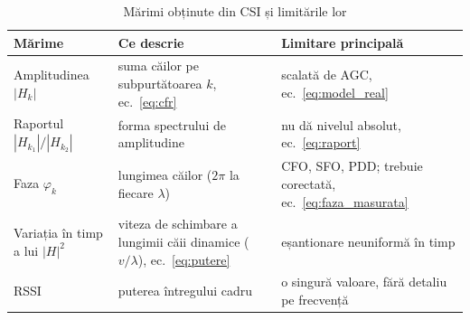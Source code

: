 \begin{table}[ht]
	\caption{Mărimi obținute din CSI și limitările lor}
	\centering
	\begin{tabular}{|p{3.4cm}|p{5.6cm}|p{5.2cm}|}
		\hline
		Mărime & Ce descrie & Limitare principală \\
		\hline
		Amplitudinea $|H_k|$ & suma căilor pe subpurtătoarea $k$, ec.~\eqref{eq:cfr} & scalată de AGC, ec.~\eqref{eq:model_real} \\
		\hline
		Raportul $|H_{k_1}|/|H_{k_2}|$ & forma spectrului de amplitudine & nu dă nivelul absolut, ec.~\eqref{eq:raport} \\
		\hline
		Faza $\varphi_k$ & lungimea căilor ($2\pi$ la fiecare $\lambda$) & CFO, SFO, PDD; trebuie corectată, ec.~\eqref{eq:faza_masurata} \\
		\hline
		Variația în timp a lui $|H|^2$ & viteza de schimbare a lungimii căii dinamice ($v/\lambda$), ec.~\eqref{eq:putere} & eșantionare neuniformă în timp \\
		\hline
		RSSI & puterea întregului cadru & o singură valoare, fără detaliu pe frecvență \\
		\hline
	\end{tabular}
	\label{tab:sinteza}
\end{table}

